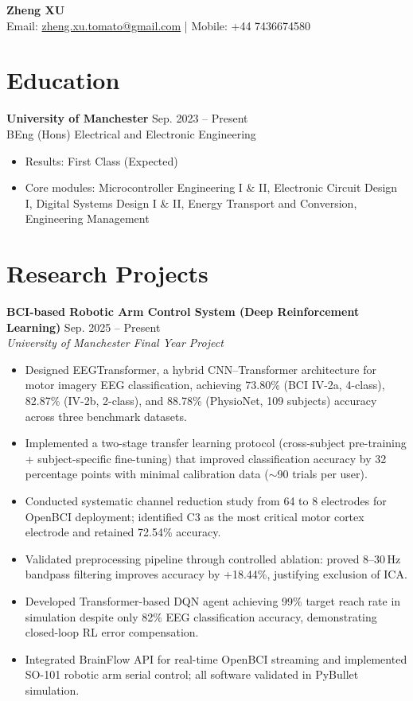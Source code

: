 \documentclass[11pt, a4paper]{article}
\newcommand{\entry}[2]{\textbf{#1} \hfill #2}
\begin{document}
\begin{center}
    {\LARGE \textbf{Zheng XU}} \\[4pt]
    Email: \href{mailto:zheng.xu.tomato@gmail.com}{zheng.xu.tomato@gmail.com} \quad | \quad Mobile: +44 7436674580
\end{center}

\section{Education}

\entry{University of Manchester}{Sep. 2023 -- Present} \\
BEng (Hons) Electrical and Electronic Engineering
\begin{itemize}[leftmargin=*, nosep, topsep=2pt]
    \item Results: First Class (Expected)
    \item Core modules: Microcontroller Engineering I \& II, Electronic Circuit Design I, Digital Systems Design I \& II, Energy Transport and Conversion, Engineering Management
\end{itemize}

\section{Research Projects}

\entry{BCI-based Robotic Arm Control System (Deep Reinforcement Learning)}{Sep. 2025 -- Present} \\
\textit{University of Manchester Final Year Project}
\begin{itemize}[leftmargin=*, nosep, topsep=2pt]
    \item Designed EEGTransformer, a hybrid CNN--Transformer architecture for motor imagery EEG classification, achieving 73.80\% (BCI IV-2a, 4-class), 82.87\% (IV-2b, 2-class), and 88.78\% (PhysioNet, 109 subjects) accuracy across three benchmark datasets.
    \item Implemented a two-stage transfer learning protocol (cross-subject pre-training + subject-specific fine-tuning) that improved classification accuracy by 32 percentage points with minimal calibration data ($\sim$90 trials per user).
    \item Conducted systematic channel reduction study from 64 to 8 electrodes for OpenBCI deployment; identified C3 as the most critical motor cortex electrode and retained 72.54\% accuracy.
    \item Validated preprocessing pipeline through controlled ablation: proved 8--30\,Hz bandpass filtering improves accuracy by +18.44\%, justifying exclusion of ICA.
    \item Developed Transformer-based DQN agent achieving 99\% target reach rate in simulation despite only 82\% EEG classification accuracy, demonstrating closed-loop RL error compensation.
    \item Integrated BrainFlow API for real-time OpenBCI streaming and implemented SO-101 robotic arm serial control; all software validated in PyBullet simulation.
\end{itemize}
\end{document}
